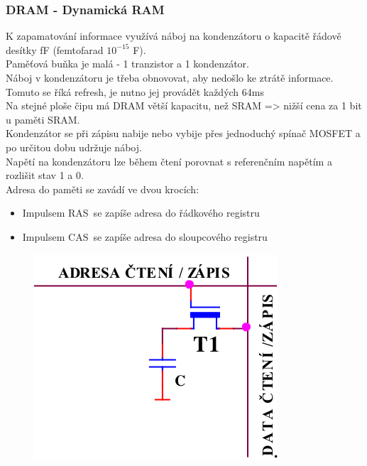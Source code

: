 \subsubsection*{DRAM - Dynamická RAM}
K zapamatování informace využívá náboj na kondenzátoru o kapacitě řádově desítky fF (femtofarad \(10^{-15}\) F).\\
Paměťová buňka je malá - 1 tranzistor a 1 kondenzátor.\\
Náboj v kondenzátoru je třeba obnovovat, aby nedošlo ke ztrátě informace. Tomuto se říká refresh, je nutno jej provádět každých 64ms\\
Na stejné ploše čipu má DRAM větší kapacitu, než SRAM => nižší cena za 1 bit u paměti SRAM.\\
Kondenzátor se při zápisu nabije nebo vybije přes jednoduchý spínač MOSFET a po určitou dobu udržuje náboj.\\
Napětí na kondenzátoru lze během čtení porovnat s referenčním napětím a rozlišit stav 1 a 0.\\
Adresa do paměti se zavádí ve dvou krocích:
\begin{itemize}
    \item Impulsem RAS\ se zapíše adresa do řádkového registru
    \item Impulsem CAS\ se zapíše adresa do sloupcového registru
\end{itemize}
\begin{figure}
    \centering
    \includegraphics[scale = 0.3]{img/DRAM.png}
\end{figure}

